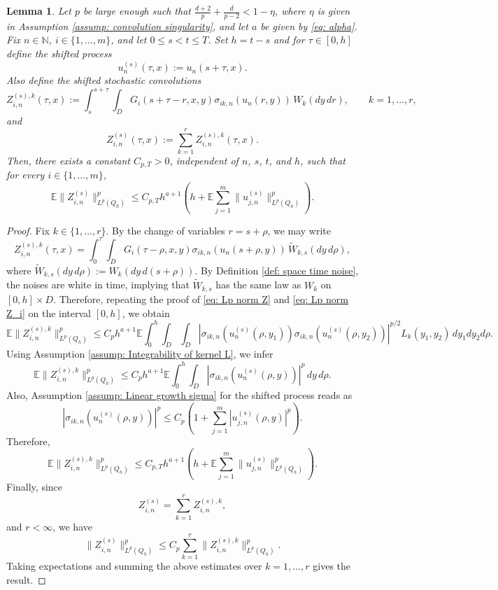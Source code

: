 \documentclass[10pt,a4paper]{amsart}
\newtheorem{lemma}{Lemma}
\begin{document}
\begin{lemma}\label{lemma: shift Z}
Let $p$ be large enough such that $\frac{d+2}{p} + \frac{d}{p-2} < 1-\eta$, where $\eta$ is given in Assumption \ref{assump: convolution singularity}, and let $a$ be given by \eqref{eq: alpha}. Fix $n \in \mathbb N$,
$i \in \{1,\dots,m\}$, and let $0 \le s < t \le T$. Set $h=t-s$ and for $\tau \in [0,h]$
define the shifted process
\[
u_n^{(s)}(\tau,x):=u_n(s+\tau,x).
\]
Also define the shifted stochastic convolutions
\[
Z_{i,n}^{(s),k}(\tau,x)
:=
\int_s^{s+\tau}\int_D
G_i(s+\tau-r,x,y)\sigma_{ik,n}(u_n(r,y))\,W_k(dy\,dr),
\qquad k=1,\dots,r,
\]
and
\[
Z_{i,n}^{(s)}(\tau,x):=\sum_{k=1}^r Z_{i,n}^{(s),k}(\tau,x).
\]
Then, there exists a constant $C_{p,T}>0$, independent of $n$, $s$, $t$, and $h$, such that
for every $i \in \{1,\dots,m\}$,
\[
\mathbb E \|Z_{i,n}^{(s)}\|_{L^p(Q_h)}^p
\le
C_{p,T} h^{a+1}
\left(
h+\mathbb E\sum_{j=1}^m \|u_{j,n}^{(s)}\|_{L^p(Q_h)}^p
\right).
\]
\end{lemma}

\begin{proof}
Fix $k \in \{1,\dots,r\}$. By the change of variables $r=s+\rho$, we may write
\[
Z_{i,n}^{(s),k}(\tau,x)
=
\int_0^\tau\int_D
G_i(\tau-\rho,x,y)\sigma_{ik,n}(u_n(s+\rho,y))\,\widetilde W_{k,s}(dy\,d\rho),
\]
where $\widetilde W_{k,s}(dy\,d\rho):=W_k(dy\,d(s+\rho))$.
By Definition \ref{def: space time noise}, the noises are white in time, implying that $\widetilde W_{k,s}$ has the same law as $W_k$ on
$[0,h]\times D$. Therefore, repeating the proof of \eqref{eq: Lp norm Z} and \eqref{eq: Lp norm Z_i}
on the interval $[0,h]$, we obtain
\[
\mathbb E \|Z_{i,n}^{(s),k}\|_{L^p(Q_h)}^p
\le
C_p h^{a+1}
\mathbb E \int_0^h\int_D\int_D
\left|
\sigma_{ik,n}(u_n^{(s)}(\rho,y_1))
\sigma_{ik,n}(u_n^{(s)}(\rho,y_2))
\right|^{p/2}
L_k(y_1,y_2)\,dy_1dy_2d\rho.
\]
Using Assumption \ref{assump: Integrability of kernel L}, we infer
\[
\mathbb E \|Z_{i,n}^{(s),k}\|_{L^p(Q_h)}^p
\le
C_p h^{a+1}
\mathbb E \int_0^h\int_D
\left|
\sigma_{ik,n}(u_n^{(s)}(\rho,y))
\right|^p\,dy\,d\rho.
\]
Also, Assumption \ref{assump: Linear growth sigma} for the shifted process reads as
\[
|\sigma_{ik,n}(u_n^{(s)}(\rho,y))|^p
\le
C_p\left(1+\sum_{j=1}^m |u_{j,n}^{(s)}(\rho,y)|^p\right).
\]
Therefore,
\[
\mathbb E \|Z_{i,n}^{(s),k}\|_{L^p(Q_h)}^p
\le
C_{p,T} h^{a+1}
\left(
h+\mathbb E\sum_{j=1}^m \|u_{j,n}^{(s)}\|_{L^p(Q_h)}^p
\right).
\]
Finally, since
\[
Z_{i,n}^{(s)}=\sum_{k=1}^r Z_{i,n}^{(s),k},
\]
and $r<\infty$, we have
\[
\|Z_{i,n}^{(s)}\|_{L^p(Q_h)}^p
\le
C_p\sum_{k=1}^r \|Z_{i,n}^{(s),k}\|_{L^p(Q_h)}^p.
\]
Taking expectations and summing the above estimates over $k=1,\dots,r$ gives the result.
\end{proof}
\end{document}
